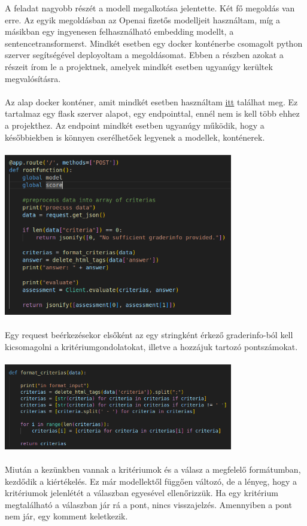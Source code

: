 \documentclass{article}
\begin{document}
A feladat nagyobb részét a modell megalkotása jelentette. Két fő megoldás van erre. Az egyik megoldásban az Openai fizetős modelljeit használtam, míg a másikban egy ingyenesen felhasználható 
embedding modellt, a sentencetransformerst. Mindkét esetben egy docker konténerbe csomagolt python szerver segítségével deployoltam a megoldásomat.
Ebben a részben azokat a részeit írom le a projektnek, amelyek mindkét esetben ugyanúgy kerültek megvalósításra.
\\
\\
\indent Az alap docker konténer, amit mindkét esetben használtam \href{https://docs.docker.com/language/python/containerize/}{itt} találhat meg.
Ez tartalmaz egy flask szerver alapot, egy endpointtal, ennél nem is kell több ehhez a projekthez. Az endpoint mindkét esetben ugyanúgy működik, hogy a későbbiekben is könnyen 
cserélhetőek legyenek a modellek, konténerek.
\\
\\
\includegraphics[width=10cm]{rootfunction.png}
\\
\\
Egy request beérkezésekor elsőként  az egy stringként érkező graderinfo-ból kell kicsomagolni a kritériumgondolatokat, illetve a hozzájuk tartozó pontszámokat.
\\
\\
\includegraphics[width=10cm]{format_criteria.png}
\\
\\
Miután a kezünkben vannak a kritériumok és a válasz a megfelelő formátumban, kezdődik a kiértékelés. Ez már modellektől függően változó, de a lényeg, hogy a kritériumok jelenlétét a válaszban egyesével ellenőrizzük. Ha egy kritérium megtalálható a válaszban jár rá a pont, nincs visszajelzés. 
Amennyiben a pont nem jár, egy komment keletkezik.
\end{document}
